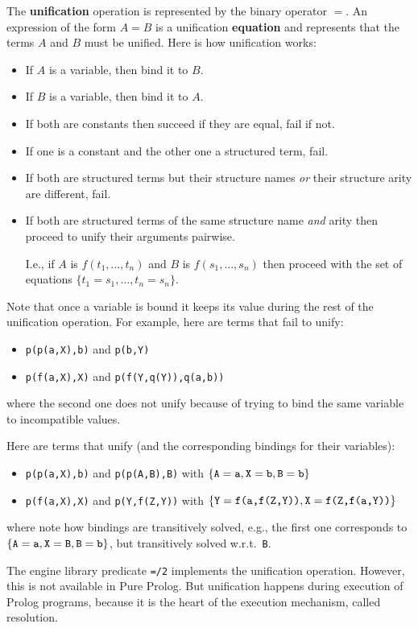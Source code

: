 The {\bf unification} operation is represented by the binary operator
$=$. An expression of the form $A=B$ is a unification {\bf equation}
and represents that the terms $A$ and $B$ must be unified. Here is how
unification works: 
\begin{itemize}
\item If $A$ is a variable, then bind it to $B$.
\item If $B$ is a variable, then bind it to $A$.
\item If both are constants then succeed if they are equal, fail if
  not. 
\item If one is a constant and the other one a structured term, fail.
\item If both are structured terms but their structure names {\em or}
  their structure arity are different, fail.
\item If both are structured terms of the same structure name {\em and}
  arity then proceed to unify their arguments pairwise.

  I.e., if $A$ is $f(t_1,\ldots,t_n)$ and $B$ is
  $f(s_1,\ldots,s_n)$ then proceed with the set of equations
  $\{t_1=s_1,\ldots,t_n=s_n\}$.
\end{itemize}
%
Note that once a variable is bound it keeps its value during the rest
of the unification operation.
%
For example, here are terms that fail to unify:
\begin{itemize}
\item \verb+p(p(a,X),b)+ and \verb+p(b,Y)+
\item \verb+p(f(a,X),X)+ and \verb+p(f(Y,q(Y)),q(a,b))+
\end{itemize}
%
where the second one does not unify because of trying to bind the same
variable to incompatible values.

Here are terms that unify (and the corresponding bindings for their
variables): 
\begin{itemize}
\item \verb+p(p(a,X),b)+ and \verb+p(p(A,B),B)+ with
  $\{\verb+A+=\verb+a+, \verb+X+=\verb+b+, \verb+B+=\verb+b+\}$
\item \verb+p(f(a,X),X)+ and \verb+p(Y,f(Z,Y))+ with
  $\{\verb+Y+=\verb+f(a,f(Z,Y))+, \verb+X+=\verb+f(Z,f(a,Y))+\}$
\end{itemize}
%
where note how bindings are transitively solved, e.g., the first one
corresponds to 
  $\{\verb+A+=\verb+a+, \verb+X+=\verb+B+, \verb+B+=\verb+b+\}$, but
transitively solved w.r.t.\ \verb+B+.

The engine library predicate \verb+=/2+ implements the unification
operation. However, this is not available in Pure Prolog. But
unification happens during execution of Prolog programs, because it is
the heart of the execution mechanism, called resolution.

